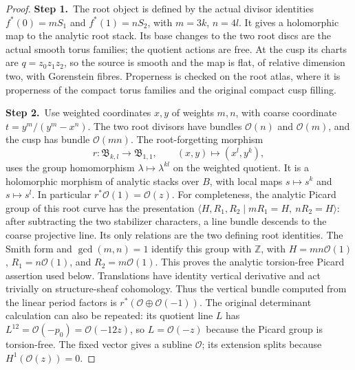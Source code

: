 \documentclass[11pt,a4paper]{article}
\theoremstyle{plain}
\theoremstyle{definition}
\begin{document}
\begin{proof}
\par\smallskip\noindent\textbf{Step 1.}\ The root object is defined by the actual divisor identities
$f^*(0)=mS_1$ and $f^*(1)=nS_2$, with $m=3k$, $n=4l$.
It gives a holomorphic map to the analytic root stack.  Its base
changes to the two root discs are the actual smooth torus
families; the quotient actions are free.  At the cusp its charts
are $q=z_0z_1z_2$, so the source is smooth and the map is flat,
of relative dimension two, with Gorenstein fibres.  Properness is
checked on the root atlas, where it is properness of the compact
torus families and the original compact cusp filling.

\par\smallskip\noindent\textbf{Step 2.}\ Use weighted coordinates $x,y$ of weights $m,n$, with coarse
coordinate $t=y^m/(y^m-x^n)$.
The two root divisors have bundles $\mathcal O(n)$ and
$\mathcal O(m)$, and the cusp has bundle $\mathcal O(mn)$.
The root-forgetting morphism
\[
 r:\mathfrak B_{k,l}\longrightarrow\mathfrak B_{1,1},
 \qquad (x,y)\longmapsto(x^l,y^k),
\]
uses the group homomorphism $\lambda\mapsto\lambda^{kl}$ on
the weighted quotient.  It is a holomorphic morphism of analytic
stacks over $B$, with local maps $s\mapsto s^k$ and
$s\mapsto s^l$.  In particular $r^*\mathcal O(1)=\mathcal O(z)$.
For completeness, the analytic Picard group of this root curve has
the presentation
$\langle H,R_1,R_2\mid mR_1=H,\ nR_2=H\rangle$:
after subtracting the two stabilizer characters, a line bundle
descends to the coarse projective line.  Its only relations are
the two defining root identities.  The Smith form and
$\gcd(m,n)=1$ identify this group with $\mathbb Z$, with
$H=mn\mathcal O(1)$, $R_1=n\mathcal O(1)$, and
$R_2=m\mathcal O(1)$.  This proves the analytic torsion-free
Picard assertion used below.
Translations have identity vertical derivative and act trivially
on structure-sheaf cohomology.  Thus the vertical bundle computed
from the linear period factors is $r^*(\mathcal O\oplus
\mathcal O(-1))$.  The original determinant calculation can also
be repeated: its quotient line $L$ has
$L^{12}=\mathcal O(-p_0)=\mathcal O(-12z)$, so
$L=\mathcal O(-z)$ because the Picard group is torsion-free.
The fixed vector gives a subline $\mathcal O$; its extension
splits because $H^1(\mathcal O(z))=0$.


\end{proof}
\end{document}
